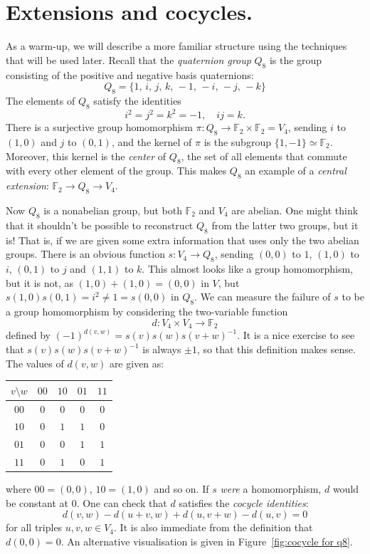 \documentclass{article}
\theoremstyle{plain}
\theoremstyle{definition}
\def \FF {\mathbb{F}}
\begin{document}
\section{Extensions and cocycles.}

As a warm-up, we will describe a more familiar structure using the techniques that will be used later. 
Recall that the \emph{quaternion group} $Q_8$ is the group consisting of the positive and negative basis quaternions:
\[
	Q_8 = \{1,\, i,\, j,\, k,\,-1,\, -i,\, -j,\, -k\}
\]
The elements of $Q_8$ satisfy the identities
\[
	i^2 = j^2 = k^2 = -1, \quad ij=k.
\]
There is a surjective group homomorphism $\pi\colon Q_8 \to \FF_2 \times \FF_2 = V_4$, sending $i$ to $(1,0)$ and $j$ to $(0,1)$, and the kernel of $\pi$ is the subgroup $\{1,-1\}\simeq \FF_2$.
Moreover, this kernel is the \emph{center} of $Q_8$, the set of all elements that commute with every other element of the group. This makes $Q_8$ an example of a \emph{central extension}: $\FF_2\to Q_8 \to V_4$.

Now $Q_8$ is a nonabelian group, but both $\FF_2$ and $V_4$ are abelian.
One might think that it shouldn't be possible to reconstruct $Q_8$ from the latter two groups, but it is! 
That is, if we are given some extra information that uses only the two abelian groups.
There is an obvious function $s\colon V_4 \to Q_8$, sending $(0,0)$ to $1$, $(1,0)$ to $i$, $(0,1)$ to $j$ and $(1,1)$ to $k$.
This almost looks like a group homomorphism, but it is not, as $(1,0) + (1,0) = (0,0)$ in $V$, but $s(1,0)s(0,1) = i^2 \not= 1 = s(0,0)$ in $Q_8$.
We can measure the failure of $s$ to be a group homomorphism by considering the two-variable function
\[
	d\colon V_4 \times V_4 \to \FF_2
\]
defined by $ (-1)^{d(v,w)} = s(v)s(w)s(v+w)^{-1}$. 
It is a nice exercise to see that $s(v)s(w)s(v+w)^{-1}$ is always $\pm 1$, so that this definition makes sense. The values of $d(v,w)$ are given as:

\begin{center}
\begin{tabular*}{0.35\textwidth}{c|cccc}
$v\setminus w$&$00$&$10$&$01$&$11$\\
\hline
	$00$		& $0$& $0$& $0$& $0$\\
	$10$		& $0$& $1$& $1$& $0$\\
	$01$		& $0$& $0$& $1$& $1$\\
	$11$		& $0$& $1$& $0$& $1$\\
\end{tabular*}
\end{center}
where $00=(0,0)$, $10=(1,0)$ and so on.
If $s$ \emph{were} a homomorphism, $d$ would be constant at $0$.
One can check that $d$ satisfies the \emph{cocycle identities}:
\[
	d(v,w)-d(u+v,w)+d(u,v+w)-d(u,v) = 0
\]
for all triples $u,v,w\in V_4$. It is also immediate from the definition that $d(0,0)=0$.
An alternative visualisation is given in Figure~\ref{fig:cocycle for q8}.
\end{document}
